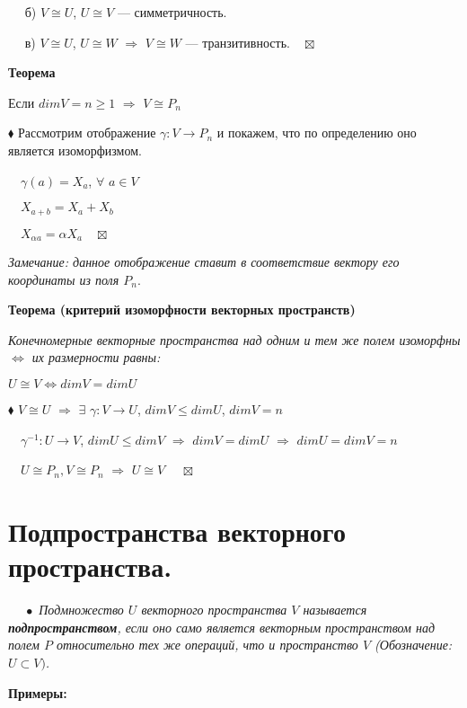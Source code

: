 \documentclass[a4paper, 12pt]{report}
\begin{document}
	$\quad$ б) $V \cong U$, $U \cong V$ --- симметричность.
	
	$\quad$ в) $V \cong U$, $U \cong W$ $\Rightarrow$ $V \cong W$ --- транзитивность.$\quad\boxtimes$
	
	\par\bigskip
	\textbf{Теорема}
	
	Если $dim V = n \geqslant 1$ $\Rightarrow$ $V \cong P_n$
	\par\bigskip
	$\blacklozenge$ Рассмотрим отображение $\gamma: V \rightarrow P_n$ и покажем, что по определению оно является изоморфизмом.
	
	$\quad\gamma(a) = X_a$, $\forall$ $a \in V$
	
	$\quad X_{a+b} = X_a + X_b$
	
	$\quad X_{\alpha a} = \alpha X_a\quad\boxtimes$
	
	\textit{Замечание: данное отображение ставит в соответствие вектору его координаты из поля $P_n$}.
	
	\par\bigskip
	\textbf{Теорема (критерий изоморфности векторных пространств)}
	
	\textit{Конечномерные векторные пространства над одним и тем же полем изоморфны $\Longleftrightarrow$ их размерности равны:}
	
	$U \cong V \Longleftrightarrow dim V = dim U$
	
	\par\bigskip
	
	$\blacklozenge$ $V \cong U$ $\Rightarrow$ $\exists$ $\gamma: V \rightarrow U$, $dim V \leqslant dim U$, $dim V = n$
	
	$\quad\gamma^{-1}: U \rightarrow V$, $dim U \leqslant dim V$ $\Rightarrow$ $dim V = dim U$ $\Rightarrow$ $dim U = dim V = n$
	
	$\quad U \cong P_n, V \cong P_n$ $\Rightarrow$ $U \cong V$
	$\quad\boxtimes$
	
	
	
	
	
	
	
	
	
	
	
	\section{Подпространства векторного пространства.}
	
	$\quad\; \bullet$ \textit{ Подмножество $U$ векторного пространства $V$ называется \textbf{подпространством}, если оно само является векторным пространством над полем $P$ относительно тех же операций, что и пространство $V$ (Обозначение: $U \subset V)$.}
	\par\bigskip
	\textbf{Примеры:}
	
\end{document}
